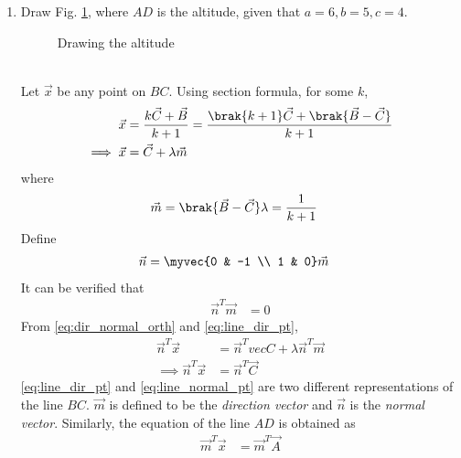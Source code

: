 %
\renewcommand{\theequation}{\theenumi}
\begin{enumerate}[label=\arabic*.,ref=\thesubsection.\theenumi]
%
\item Draw Fig. \ref{fig:tri_alt}, where $AD$ is the altitude, given that $a = 6, b = 5, c = 4$.  
%
\begin{figure}[!ht]
	\begin{center}
		\resizebox{\columnwidth}{!}{}
	\end{center}
	\caption{Drawing the altitude}
	\label{fig:tri_alt}	
\end{figure}
\\
\solution Let $\vec{x}$ be any point on $BC$.  Using section formula, for some $k$, 
%
\begin{align}
\vec{x} &= \frac{k\vec{C}+\vec{B}}{k+1} = \frac{\brak{k+1}\vec{C}+\brak{\vec{B}-\vec{C}}}{k+1}
\\
\implies \vec{x} &= \vec{C} + \lambda \vec{m}
\label{eq:line_dir_pt}
\end{align}
%
where 
%
\begin{align}
\vec{m} &= \brak{\vec{B}-\vec{C}}
\lambda = \frac{1}{k+1}
\end{align}
%
Define
%
\begin{align}
\vec{n} &= \myvec{0 & -1 \\ 1 & 0}\vec{m}
\end{align}
%
It can be verified that 
%
\begin{align}
\label{eq:dir_normal_orth}
\vec{n}^T\vec{m} &= 0
\end{align}
%
From \eqref{eq:dir_normal_orth} and \eqref{eq:line_dir_pt}, 
%
\begin{align}
\vec{n}^T\vec{x} &= \vec{n}^Tvec{C} + \lambda \vec{n}^T\vec{m}
\\
\implies \vec{n}^T\vec{x} &= \vec{n}^T\vec{C}
\label{eq:line_normal_pt}
\end{align}
%
\eqref{eq:line_dir_pt} and \eqref{eq:line_normal_pt} are two different representations of the line $BC$.  $\vec{m}$ is defined to be the {\em direction vector} and $\vec{n}$ is the {\em normal vector}. Similarly, the equation of the line $AD$ is obtained as
%
\begin{align}
\vec{m}^T\vec{x} &= \vec{m}^T\vec{A} 
\label{eq:line_normal_pt_AD}
\end{align}

\end{enumerate}
